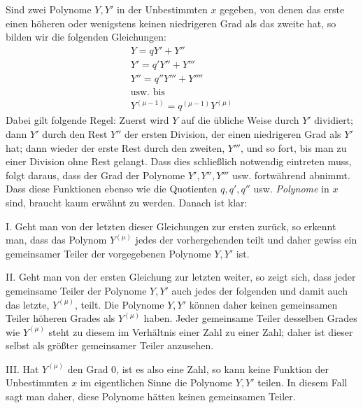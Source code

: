 Sind zwei Polynome $Y,Y'$ in der Unbestimmten $x$ gegeben, von denen das erste einen höheren oder wenigstens keinen niedrigeren Grad als das zweite hat, so bilden wir die folgenden Gleichungen:
\[
\begin{gathered} Y=qY'+Y''\\ Y'=q'Y''+Y'''\\ Y''=q''Y'''+Y''''\\ \text{usw. bis}\\ Y^{(\mu-1)}=q^{(\mu-1)}Y^{(\mu)}
\end{gathered}
\]
Dabei gilt folgende Regel: Zuerst wird $Y$ auf die übliche Weise durch $Y'$ dividiert; dann $Y'$ durch den Rest $Y''$ der ersten Division, der einen niedrigeren Grad als $Y'$ hat; dann wieder der erste Rest durch den zweiten, $Y'''$, und so fort, bis man zu einer Division ohne Rest gelangt. Dass dies schließlich notwendig eintreten muss, folgt daraus, dass der Grad der Polynome $Y',Y'',Y'''$ usw. fortwährend abnimmt. Dass diese Funktionen ebenso wie die Quotienten $q,q',q''$ usw. \textit{Polynome} in $x$ sind, braucht kaum erwähnt zu werden. Danach ist klar:

I. Geht man von der letzten dieser Gleichungen zur ersten zurück, so erkennt man, dass das Polynom $Y^{(\mu)}$ jedes der vorhergehenden teilt und daher gewiss ein gemeinsamer Teiler der vorgegebenen Polynome $Y,Y'$ ist.

II. Geht man von der ersten Gleichung zur letzten weiter, so zeigt sich, dass jeder gemeinsame Teiler der Polynome $Y,Y'$ auch jedes der folgenden und damit auch das letzte, $Y^{(\mu)}$, teilt. Die Polynome $Y,Y'$ können daher keinen gemeinsamen Teiler höheren Grades als $Y^{(\mu)}$ haben. Jeder gemeinsame Teiler desselben Grades wie $Y^{(\mu)}$ steht zu diesem im Verhältnis einer Zahl zu einer Zahl; daher ist dieser selbst als größter gemeinsamer Teiler anzusehen.
\par
{}
III. Hat $Y^{(\mu)}$ den Grad 0, ist es also eine Zahl, so kann keine Funktion der Unbestimmten $x$ im eigentlichen Sinne die Polynome $Y,Y'$ teilen. In diesem Fall sagt man daher, diese Polynome hätten keinen gemeinsamen Teiler.

